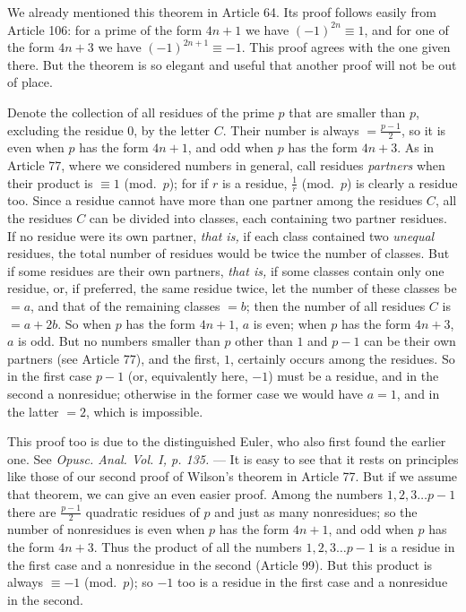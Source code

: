 We already mentioned this theorem in Article 64. Its proof follows easily from Article 106: for a prime of the form $4n+1$ we have $(-1)^{2n}\equiv1$, and for one of the form $4n+3$ we have $(-1)^{2n+1}\equiv-1$. This proof agrees with the one given there. But the theorem is so elegant and useful that another proof will not be out of place.

Denote the collection of all residues of the prime $p$ that are smaller than $p$, excluding the residue $0$, by the letter $C$. Their number is always $=\frac{p-1}{2}$, so it is even when $p$ has the form $4n+1$, and odd when $p$ has the form $4n+3$. As in Article 77, where we considered numbers in general, call residues \emph{partners} when their product is $\equiv1$ (mod.~$p$); for if $r$ is a residue, $\frac{1}{r}$ (mod.~$p$) is clearly a residue too. Since a residue cannot have more than one partner among the residues $C$, all the residues $C$ can be divided into classes, each containing two partner residues. If no residue were its own partner, \emph{that is,} if each class contained two \emph{unequal} residues, the total number of residues would be twice the number of classes. But if some residues are their own partners, \emph{that is,} if some classes contain only one residue, or, if preferred, the same residue twice, let the number of these classes be $=a$, and that of the remaining classes $=b$; then the number of all residues $C$ is $=a+2b$. So when $p$ has the form $4n+1$, $a$ is even; when $p$ has the form $4n+3$, $a$ is odd. But no numbers smaller than $p$ other than $1$ and $p-1$ can be their own partners (see Article 77), and the first, $1$, certainly occurs among the residues. So in the first case $p-1$ (or, equivalently here, $-1$) must be a residue, and in the second a nonresidue; otherwise in the former case we would have $a=1$, and in the latter $=2$, which is impossible.

This proof too is due to the distinguished Euler, who also first found the earlier one. See \emph{Opusc. Anal. Vol. I, p. 135.} --- It is easy to see that it rests on principles like those of our second proof of Wilson's theorem in Article 77. But if we assume that theorem, we can give an even easier proof. Among the numbers $1,2,3\ldots p-1$ there are $\frac{p-1}{2}$ quadratic residues of $p$ and just as many nonresidues; so the number of nonresidues is even when $p$ has the form $4n+1$, and odd when $p$ has the form $4n+3$. Thus the product of all the numbers $1,2,3\ldots p-1$ is a residue in the first case and a nonresidue in the second (Article 99). But this product is always $\equiv-1$ (mod.~$p$); so $-1$ too is a residue in the first case and a nonresidue in the second.

